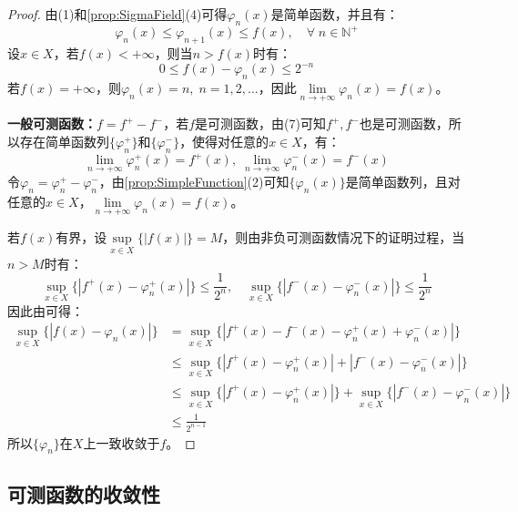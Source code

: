 \begin{proof}
	由(1)和\cref{prop:SigmaField}(4)可得$\varphi_n(x)$是简单函数，并且有：
	\begin{equation*}
		\varphi_n(x)\leqslant\varphi_{n+1}(x)\leqslant f(x),\quad\forall\;n\in\mathbb{N}^+
	\end{equation*}
	设$x\in X$，若$f(x)<+\infty$，则当$n>f(x)$时有：
	\begin{equation*}
		0\leqslant f(x)-\varphi_n(x)\leqslant 2^{-n}
	\end{equation*}
	若$f(x)=+\infty$，则$\varphi_n(x)=n,\;n=1,2,\dots$，因此$\lim\limits_{n\to+\infty}\varphi_n(x)=f(x)$。\par
	\textbf{一般可测函数：}$f=f^+-f^-$，若$f$是可测函数，由(7)可知$f^+,f^-$也是可测函数，所以存在简单函数列$\{\varphi_n^+\}$和$\{\varphi_n^-\}$，使得对任意的$x\in X$，有：
	\begin{equation*}
		\lim\limits_{n\to+\infty}\varphi_n^+(x)=f^+(x),\;
		\lim\limits_{n\to+\infty}\varphi_n^-(x)=f^-(x)
	\end{equation*}
	令$\varphi_n=\varphi_n^+-\varphi_n^-$，由\cref{prop:SimpleFunction}(2)可知$\{\varphi_n(x)\}$是简单函数列，且对任意的$x\in X$，$\lim\limits_{n\to+\infty}\varphi_n(x)=f(x)$。\par
	若$f(x)$有界，设$\sup\limits_{x\in X}\{|f(x)|\}=M$，则由非负可测函数情况下的证明过程，当$n>M$时有：
	\begin{equation*}
		\sup_{x\in X}\{|f^+(x)-\varphi_n^+(x)|\}\leqslant\frac{1}{2^n},\quad
		\sup_{x\in X}\{|f^-(x)-\varphi_n^-(x)|\}\leqslant\frac{1}{2^n}
	\end{equation*}
	因此由可得：
	\begin{align*}
		\sup_{x\in X}\{|f(x)-\varphi_n(x)|\}
		&=\sup_{x\in X}\{|f^+(x)-f^-(x)-\varphi_n^+(x)+\varphi_n^-(x)|\} \\
		&\leqslant\sup_{x\in X}\{|f^+(x)-\varphi_n^+(x)|+|f^-(x)-\varphi_n^-(x)|\} \\
		&\leqslant\sup_{x\in X}\{|f^+(x)-\varphi_n^+(x)|\}+\sup_{x\in X}\{|f^-(x)-\varphi_n^-(x)|\} \\
		&\leqslant\frac{1}{2^{n-1}}
	\end{align*}
	所以$\{\varphi_n\}$在$X$上一致收敛于$f$。
\end{proof}

\subsection{可测函数的收敛性}
